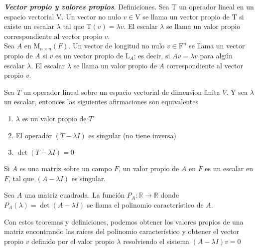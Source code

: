 \documentclass{report}
\begin{document}
    \begin{defBox}
        \textit{\textbf{Vector propio y valores propios}}. Definiciones. Sea $\mathrm{T}$ un operador lineal en un espacio vectorial V. Un vector no nulo $v \in \mathrm{V}$ se llama un vector propio de $\mathrm{T}$ si existe un escalar $\lambda$ tal que $\mathrm{T}(v)=\lambda v$. El escalar $\lambda$ se llama un valor propio correspondiente al vector propio $v$.\\
        
        Sea $A$ en $\mathrm{M}_{n \times n}(F)$. Un vector de longitud no nulo $v \in \mathrm{F}^n$ se llama un vector propio de $A$ si $v$ es un vector propio de $\mathrm{L}_A$; es decir, si $A v=\lambda v$ para algún escalar $\lambda$. El escalar $\lambda$ se llama un valor propio de $A$ correspondiente al vector propio $v$.
    \end{defBox}
    
    \begin{thBox}
        Sea $T$ un operador lineal sobre un espacio vectorial de dimension finita $V$. Y sea $\lambda$ un escalar, entonces las siguientes afirmaciones son equivalentes
    
        \begin{enumerate}
            \item $\lambda$ es un valor propio de $T$
            \item El operador $(T - \lambda I)$ es singular (no tiene inversa)
            \item $\det(T-\lambda I) = 0$
        \end{enumerate}
    \end{thBox}
    
    \begin{defBox}
        Si $A$ es una matriz sobre un campo $F$, un valor propio de $A$ en $F$ es un escalar en $F$, tal que $(A - \lambda I)$ es singular.
    \end{defBox}
    
    \begin{defBox}
        Sea $A$ una matriz cuadrada. La función $P_A: \mathbb{R} \to \mathbb{R}$ donde $P_A(\lambda) = \det(A - \lambda I)$ se llama el polinomio característico de $A$.
    \end{defBox}
    
    Con estos teoremas y definiciones, podemos obtener los valores propios de una matriz encontrando las raíces del polinomio característico y obtener el vector propio $v$ definido por el valor propio $\lambda$ resolviendo el sistema $(A-\lambda I)v = 0$
    
\end{document}
